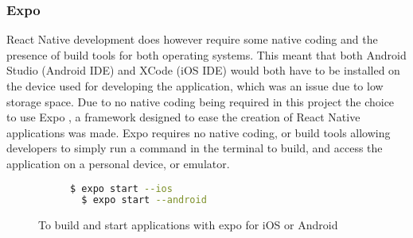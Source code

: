 \subsubsection{Expo}
React Native development does however require some native coding and the presence of build tools for both operating systems. This meant that both Android Studio (Android IDE) and XCode (iOS IDE) would both have to be installed on the device used for developing the application, which was an issue due to low storage space. Due to no native coding being required in this project the choice to use Expo \cite{expo}, a framework designed to ease the creation of React Native applications was made. Expo requires no native coding, or build tools allowing developers to simply run a command in the terminal to build, and access the application on a personal device, or emulator.
\begin{figure}[!htbp]
\centering
\begin{subfigure}[b]{0.5\textwidth}
\begin{lstlisting}[language=bash]
  $ expo start --ios
  $ expo start --android
\end{lstlisting}
\end{subfigure}
\caption{To build and start applications with expo for iOS or Android}
\end{figure}
